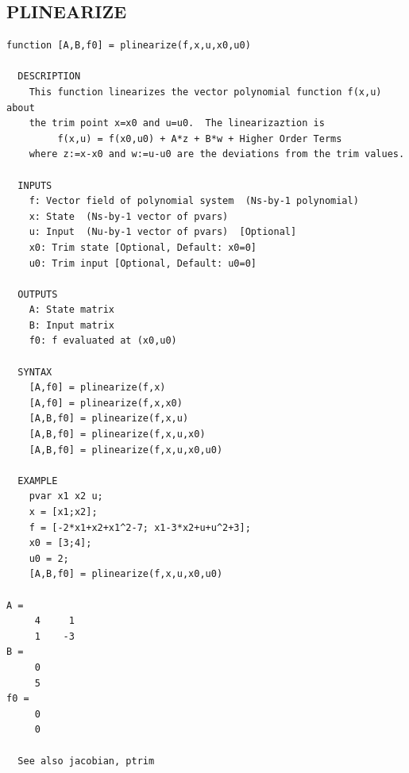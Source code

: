 \documentclass{article}
\begin{document}
\newpage
\subsection{PLINEARIZE}
\begin{verbatim}
function [A,B,f0] = plinearize(f,x,u,x0,u0)

  DESCRIPTION
    This function linearizes the vector polynomial function f(x,u) about
    the trim point x=x0 and u=u0.  The linearizaztion is
         f(x,u) = f(x0,u0) + A*z + B*w + Higher Order Terms
    where z:=x-x0 and w:=u-u0 are the deviations from the trim values.

  INPUTS
    f: Vector field of polynomial system  (Ns-by-1 polynomial)
    x: State  (Ns-by-1 vector of pvars)
    u: Input  (Nu-by-1 vector of pvars)  [Optional]
    x0: Trim state [Optional, Default: x0=0]
    u0: Trim input [Optional, Default: u0=0]

  OUTPUTS
    A: State matrix
    B: Input matrix
    f0: f evaluated at (x0,u0)

  SYNTAX
    [A,f0] = plinearize(f,x)
    [A,f0] = plinearize(f,x,x0)
    [A,B,f0] = plinearize(f,x,u)
    [A,B,f0] = plinearize(f,x,u,x0)
    [A,B,f0] = plinearize(f,x,u,x0,u0)

  EXAMPLE
    pvar x1 x2 u;
    x = [x1;x2];
    f = [-2*x1+x2+x1^2-7; x1-3*x2+u+u^2+3];
    x0 = [3;4];
    u0 = 2;
    [A,B,f0] = plinearize(f,x,u,x0,u0)

A =
     4     1
     1    -3
B =
     0
     5
f0 =
     0
     0

  See also jacobian, ptrim

\end{verbatim}

\newpage
\end{document}
